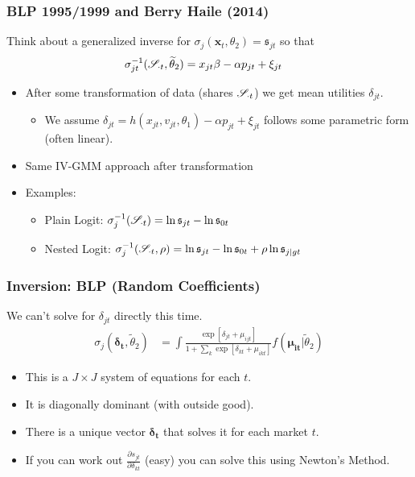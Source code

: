 \documentclass[aspectratio=169,11pt]{beamer}
\begin{document}
\begin{frame}
\frametitle{BLP 1995/1999 and Berry Haile (2014)}
Think about a \alert{generalized inverse} for $\sigma_{j}(\symbf{x}_t,\theta_2) = \mathfrak{s}_{jt}$ so that 
\begin{align*}
 \sigma_{jt}^{-1}(\mathscr{S}_{\cdot t},\widetilde{\theta}_2)&= x_{jt} \beta -\alpha p_{jt} +  \xi_{jt} 
\end{align*}
 \begin{itemize}
\item After some transformation of data (shares $\mathscr{S}_{\cdot t}$) we get \alert{mean utilities} $\delta_{jt}$.
\begin{itemize}
\item We assume $\delta_{jt}=h(x_{jt},v_{jt},\theta_1) -\alpha p_{jt} + \xi_{jt}$ follows some parametric form (often linear).
 \end{itemize}
\item Same IV-GMM approach after transformation
\item Examples:
\begin{itemize}
\item Plain Logit: $\sigma_{j}^{-1}(\mathscr{S}_{\cdot t}) = \ln \mathfrak{s}_{jt}- \ln \mathfrak{s}_{0t}$
\item Nested Logit: $\sigma_{j}^{-1}(\mathscr{S}_{\cdot t},\rho) = \ln \mathfrak{s}_{jt}- \ln \mathfrak{s}_{0t} + \rho  \ln \mathfrak{s}_{j|gt}$
 \end{itemize}
 \end{itemize}
\end{frame}


\begin{frame}
\frametitle{Inversion: BLP (Random Coefficients)}
We can't solve for $\delta_{jt}$ directly this time.
\begin{align*}
\sigma_{j}(\symbf{\delta_{t}},\widetilde{\theta}_2) &= \int \frac{\exp[\delta_{jt} + \mu_{ijt} ]}{1+\sum_k \exp[\delta_{kt} +  \mu_{ikt}  ]} f(\symbf{\mu_{it}} | \widetilde{\theta}_2)
\end{align*}
 \begin{itemize}
 \item This is a $J \times J$ system of equations for each $t$.
 \item It is diagonally dominant (with outside good).
 \item There is a unique vector $\symbf{\delta_{t}}$ that solves it for each market $t$.
 \item If you can work out $\frac{\partial s_{jt}}{\partial \delta_{kt}}$ (easy) you can solve this using Newton's Method.
 \end{itemize}
\end{frame}
\end{document}
